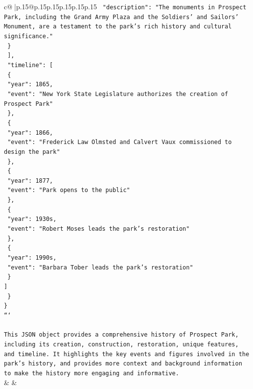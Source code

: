 \documentclass{article}
\begin{document}
{\begin{supertabular}{c@{$\;$}|p{.15\linewidth}@{}p{.15\linewidth}p{.15\linewidth}p{.15\linewidth}p{.15\linewidth}p{.15\linewidth}}
{{{\texttt{        "description": "The monuments in Prospect Park, including the Grand Army Plaza and the Soldiers' and Sailors' Monument, are a testament to the park's rich history and cultural significance."} \\
\texttt{      \}} \\
\texttt{    {]},} \\
\texttt{    "timeline": {[}} \\
\texttt{      \{} \\
\texttt{        "year": 1865,} \\
\texttt{        "event": "New York State Legislature authorizes the creation of Prospect Park"} \\
\texttt{      \},} \\
\texttt{      \{} \\
\texttt{        "year": 1866,} \\
\texttt{        "event": "Frederick Law Olmsted and Calvert Vaux commissioned to design the park"} \\
\texttt{      \},} \\
\texttt{      \{} \\
\texttt{        "year": 1877,} \\
\texttt{        "event": "Park opens to the public"} \\
\texttt{      \},} \\
\texttt{      \{} \\
\texttt{        "year": 1930s,} \\
\texttt{        "event": "Robert Moses leads the park's restoration"} \\
\texttt{      \},} \\
\texttt{      \{} \\
\texttt{        "year": 1990s,} \\
\texttt{        "event": "Barbara Tober leads the park's restoration"} \\
\texttt{      \}} \\
\texttt{    {]}} \\
\texttt{  \}} \\
\texttt{\}} \\
\texttt{```} \\
\\ 
\texttt{This JSON object provides a comprehensive history of Prospect Park, including its creation, construction, restoration, unique features, and timeline. It highlights the key events and figures involved in the park's history, and provides more context and background information to make the history more engaging and informative.} \\
            }
        }
    }
    & & \\ \\


\end{supertabular}}
\end{document}
